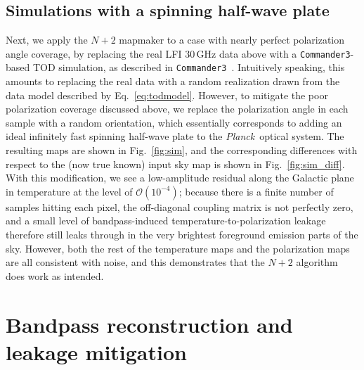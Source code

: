 \documentclass{aa}
\def\commanderthree{\texttt{Commander3}}
\def\Planck{\textit{Planck}}
\begin{document}
\subsection{Simulations with a spinning half-wave plate}
\label{sec:sim}

Next, we apply the $N+2$ mapmaker to a case with nearly perfect polarization angle coverage, by replacing the real LFI 30\,GHz data above with a \commanderthree-based TOD simulation, as described in \commanderthree\ \citep{BP04}. Intuitively speaking, this amounts to replacing the real data with a random realization drawn from the data model described by Eq.~\ref{eq:todmodel}. However, to mitigate the poor polarization coverage discussed above, we replace the polarization angle in each sample with a random orientation, which essentially corresponds to adding an ideal infinitely fast spinning half-wave plate to the \Planck\ optical system. The resulting maps are shown in Fig.~\ref{fig:sim}, and the corresponding differences with respect to the (now true known) input sky map is shown in Fig.~\ref{fig:sim_diff}. With this modification, we see a low-amplitude residual along the Galactic plane in temperature at the level of $\mathcal{O}(10^{-4})$; because there is a finite number of samples hitting each pixel, the off-diagonal coupling matrix is not perfectly zero, and a small level of bandpass-induced temperature-to-polarization leakage therefore still leaks through in the very brightest foreground emission parts of the sky. However, both the rest of the temperature maps and the polarization maps are all consistent with noise, and this demonstrates that the $N+2$ algorithm does work as intended.

\section{Bandpass reconstruction and leakage mitigation}
\label{sec:bandpass}
\end{document}

